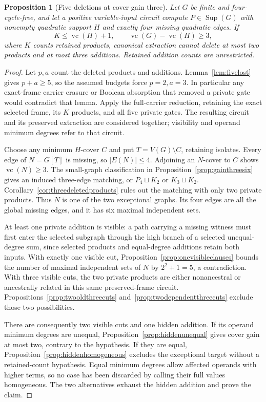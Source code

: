 \documentclass[11pt]{article}
\newcommand{\Sup}{\operatorname{Sup}}
\newcommand{\vc}{\operatorname{vc}}
\newtheorem{proposition}[theorem]{Proposition}
\theoremstyle{definition}
\theoremstyle{remark}
\begin{document}
\begin{proposition}[Five deletions at cover gain three]\label{prop:gainthreefiveprivate}
Let $G$ be finite and four-cycle-free, and let a positive variable-input circuit compute $P\in\Sup(G)$ with nonempty quadratic support $H$ and exactly four missing quadratic edges. If
\[
 K\le\vc(H)+1,\qquad \vc(G)-\vc(H)\ge3,
\]
where $K$ counts retained products, canonical extraction cannot delete at most two products and at most three additions. Retained addition counts are unrestricted.
\end{proposition}
\begin{proof}
Let $p,a$ count the deleted products and additions. Lemma~\ref{lem:fivelost} gives $p+a\ge5$, so the assumed budgets force $p=2,a=3$. In particular any exact-frame carrier erasure or Boolean absorption that removed a private gate would contradict that lemma. Apply the full-carrier reduction, retaining the exact selected frame, its $K$ products, and all five private gates. The resulting circuit and its preserved extraction are considered together; visibility and operand minimum degrees refer to that circuit.

Choose any minimum $H$-cover $C$ and put $T=V(G)\setminus C$, retaining isolates. Every edge of $N=G[T]$ is missing, so $|E(N)|\le4$. Adjoining an $N$-cover to $C$ shows $\vc(N)\ge3$. The small-graph classification in Proposition~\ref{prop:gainthreesix} gives an induced three-edge matching, or $P_4\sqcup K_2$ or $K_3\sqcup K_2$. Corollary~\ref{cor:threedeletedproducts} rules out the matching with only two private products. Thus $N$ is one of the two exceptional graphs. Its four edges are all the global missing edges, and it has six maximal independent sets.

At least one private addition is visible: a path carrying a missing witness must first enter the selected subgraph through the high branch of a selected unequal-degree sum, since selected products and equal-degree additions retain both inputs. With exactly one visible cut, Proposition~\ref{prop:onevisibleclauses} bounds the number of maximal independent sets of $N$ by $2^2+1=5$, a contradiction. With three visible cuts, the two private products are either nonancestral or ancestrally related in this same preserved-frame circuit. Propositions~\ref{prop:twooldthreecuts} and~\ref{prop:twodependentthreecuts} exclude those two possibilities.

There are consequently two visible cuts and one hidden addition. If its operand minimum degrees are unequal, Proposition~\ref{prop:hiddenunequal} gives cover gain at most two, contrary to the hypothesis. If they are equal, Proposition~\ref{prop:hiddenhomogeneous} excludes the exceptional target without a retained-count hypothesis. Equal minimum degrees allow affected operands with higher terms, so no case has been discarded by calling their full values homogeneous. The two alternatives exhaust the hidden addition and prove the claim.
\end{proof}
\end{document}
